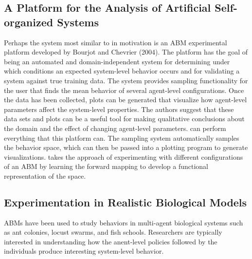 \subsection{A Platform for the Analysis of Artificial Self-organized Systems}
Perhaps the system most similar to \fw in motivation is an ABM experimental platform developed by Bourjot and Chevrier (2004)\nocite{bourjot2004platform}.
The platform has the goal of being an automated and domain-independent system for determining under which conditions an expected system-level behavior occurs and for validating a system against true training data.
The system provides sampling functionality for the user that finds the mean behavior of several agent-level configurations.
Once the data has been collected, plots can be generated that visualize how agent-level parameters affect the system-level properties.
The authors suggest that these data sets and plots can be a useful tool for making qualitative conclusions about the domain and the effect of changing agent-level parameters.
\fw can perform everything that this platform can.
The \fw sampling system automatically samples the behavior space, which can then be passed into a plotting program to generate visualizations.
\fw takes the approach of experimenting with different configurations of an ABM by learning the forward mapping to develop a functional representation of the space.

\subsection{Experimentation in Realistic Biological Models}
ABMs have been used to study behaviors in multi-agent biological systems such as ant colonies, locust swarms, and fish schools.
Researchers are typically interested in understanding how the anent-level policies followed by the individuals produce interesting system-level behavior.

